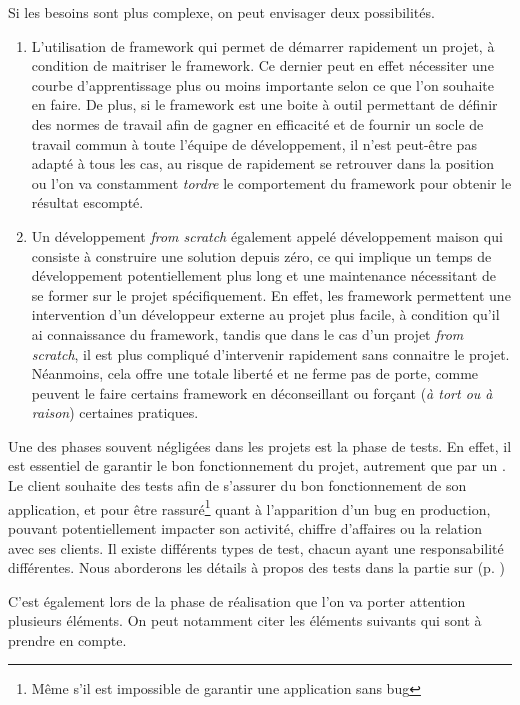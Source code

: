 Si les besoins sont plus complexe, on peut envisager deux possibilités.

\begin{enumerate}
	\item L'utilisation de \gls{framework} qui permet de démarrer rapidement un projet, à condition de maitriser le \gls{framework}. Ce dernier peut en effet nécessiter une courbe d'apprentissage plus ou moins importante selon ce que l'on souhaite en faire. De plus, si le \gls{framework} est une boite à outil permettant de définir des normes de travail afin de gagner en efficacité et de fournir un socle de travail commun à toute l'équipe de développement, il n'est peut-être pas adapté à tous les cas, au risque de rapidement se retrouver dans la position ou l'on va constamment \emph{tordre} le comportement du \gls{framework} pour obtenir le résultat escompté.
	\item Un développement \emph{from scratch} également appelé développement maison qui consiste à construire une solution depuis zéro, ce qui implique un temps de développement potentiellement plus long et une maintenance nécessitant de se former sur le projet spécifiquement. En effet, les \gls{framework} permettent une intervention d'un développeur externe au projet plus facile, à condition qu'il ai connaissance du \gls{framework}, tandis que dans le cas d'un projet \emph{from scratch}, il est plus compliqué d'intervenir rapidement sans connaitre le projet. Néanmoins, cela offre une totale liberté et ne ferme pas de porte, comme peuvent le faire certains \gls{framework} en déconseillant ou forçant (\emph{à tort ou à raison}) certaines pratiques.
\end{enumerate}

Une des phases souvent négligées dans les projets est la phase de tests. En effet, il est essentiel de garantir le bon fonctionnement du projet, autrement que par un . Le client souhaite des tests afin de s'assurer du bon fonctionnement de son application, et pour être rassuré\footnote{Même s'il est impossible de garantir une application sans bug} quant à l'apparition d'un bug en production, pouvant potentiellement impacter son activité, chiffre d'affaires ou la relation avec ses clients. Il existe différents types de test, chacun ayant une responsabilité différentes. Nous aborderons les détails à propos des tests dans la partie sur  (p. \pageref{importance-test})

C'est également lors de la phase de réalisation que l'on va porter attention plusieurs éléments. On peut notamment citer les éléments suivants qui sont à prendre en compte.

